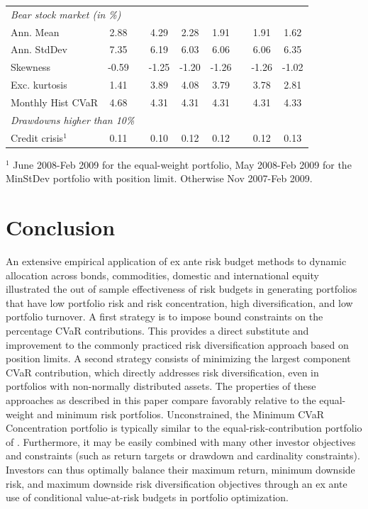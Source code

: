 \documentclass[12pt,a4paper]{article}
\begin{document}
\begin{table}[tb]
\begin{center}
{\begin{tabular}{|lc c c ccc c cc | }
 \multicolumn{10}{|l|}{\emph{Bear stock market (in \%)}} \\
 \multicolumn{2}{|l}{Ann. Mean  }    &        2.88 & & 4.29 & 2.28 & 1.91 & & 1.91& 1.62   \\
 \multicolumn{2}{|l}{Ann. StdDev}     &        7.35 & & 6.19 & 6.03 & 6.06 & & 6.06& 6.35  \\
  \multicolumn{2}{|l}{Skewness}     &          -0.59 & & -1.25 & -1.20 & -1.26 & & -1.26& -1.02 \\
    \multicolumn{2}{|l}{Exc. kurtosis}   &     1.41 & & 3.89 & 4.08 & 3.79 & & 3.78& 2.81   \\
 \multicolumn{2}{|l}{Monthly Hist  CVaR}   &	 4.68 & & 4.31 & 4.31 & 4.31 & & 4.31& 4.33  \\ \hline
 \multicolumn{10}{|l|}{ \emph{Drawdowns higher than 10\%}  }  \\
 \multicolumn{2}{|l}{Credit crisis$^{1}$}       &  0.11 &  & 0.10 & 0.12 & 0.12 & & 0.12 & 0.13   \\
 \hline
\end{tabular}
}
\end{center}



{\scriptsize $^{1}$ June 2008-Feb 2009 for the equal-weight portfolio, May 2008-Feb 2009 for the MinStDev portfolio with position limit.  Otherwise Nov 2007-Feb 2009.  }
\end{table}

\clearpage
\section{Conclusion \label{sec:Conclusion}}

An extensive empirical application of ex ante risk budget methods to dynamic allocation across bonds, commodities, domestic and international equity illustrated the out of sample effectiveness of risk budgets in generating portfolios that have low portfolio risk and risk concentration, high diversification, and low portfolio turnover. A first strategy is to impose bound constraints on the percentage CVaR contributions. This provides a direct substitute and improvement to the commonly practiced risk diversification approach based on position limits. A second strategy consists of minimizing the largest component CVaR contribution, which directly addresses risk diversification, even in portfolios with non-normally distributed assets. The properties of these approaches as described in this paper compare favorably relative to the equal-weight and minimum risk portfolios. Unconstrained, the Minimum CVaR Concentration  portfolio is typically similar to the equal-risk-contribution portfolio of \citet{Qian2005}. Furthermore, it may be easily combined with many other investor objectives and constraints (such as return targets or drawdown and cardinality constraints). Investors can thus optimally balance their maximum return, minimum downside risk, and maximum downside risk diversification objectives through an ex ante use of conditional value-at-risk  budgets in portfolio optimization.
\end{document}
